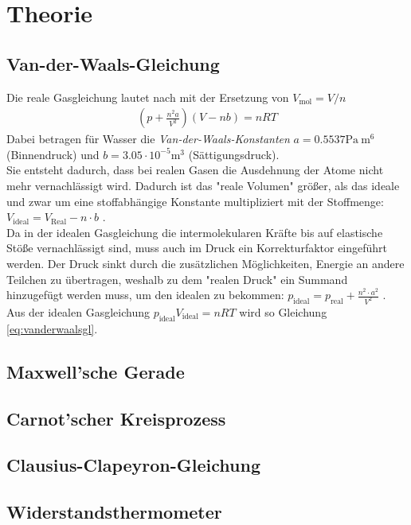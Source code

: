 \documentclass[12pt,a4paper,titlepage,headinclude,bibtotoc]{scrartcl}
\begin{document}
\section{Theorie}
\label{sec:theorie}

\subsection{Van-der-Waals-Gleichung}
Die reale Gasgleichung lautet nach \cite[S. 303]{gerthsen} mit der Ersetzung von $V_\text{mol}=V/n$ 
\begin{align}
	\left(p+\frac{n^2a}{V^2}\right)\left( V-nb \right)=nRT \label{eq:vanderwaalsgl}
\end{align}
Dabei betragen für Wasser die \emph{Van-der-Waals-Konstanten} $a=0.5537\si{\pascal~\meter^6}$ (Binnendruck) und $b=3.05\cdot10^{-5}\si{\meter^3}$ (Sättigungsdruck).\\
Sie entsteht dadurch, dass bei realen Gasen die Ausdehnung der Atome nicht mehr vernachlässigt wird.
Dadurch ist das "reale Volumen" größer, als das ideale und zwar um eine stoffabhängige Konstante multipliziert mit der Stoffmenge: $V_\text{ideal}=V_\text{Real}-n\cdot b$ .\\
Da in der idealen Gasgleichung die intermolekularen Kräfte bis auf elastische Stöße vernachlässigt sind, muss auch im Druck ein Korrekturfaktor eingeführt werden.
Der Druck sinkt durch die zusätzlichen Möglichkeiten, Energie an andere Teilchen zu übertragen, weshalb zu dem "realen Druck" ein Summand hinzugefügt werden muss, um den idealen zu bekommen: $p_\text{ideal}=p_\text{real}+\frac{n^2\cdot a^2}{V^2}$ .
Aus der idealen Gasgleichung $p_\text{ideal}V_\text{ideal}=nRT$ wird so Gleichung \eqref{eq:vanderwaalsgl}.


\subsection{Maxwell'sche Gerade}

\subsection{Carnot'scher Kreisprozess}

\subsection{Clausius-Clapeyron-Gleichung}

\subsection{Widerstandsthermometer}
\end{document}
